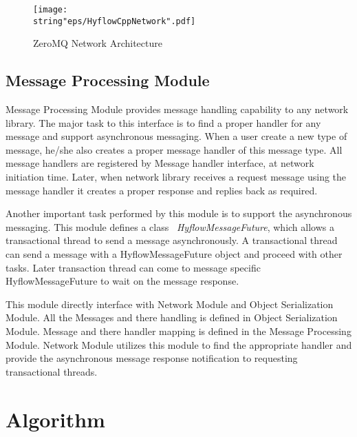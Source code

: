 \documentclass[12pt,english]{report}
\begin{document}
\begin{figure}
\begin{minipage}[b]{0.9\linewidth}\centering
\centering \texttt{[image: \\string"eps/HyflowCppNetwork".pdf]}
\caption{ZeroMQ Network Architecture}
\label{Fig:HyflowCppNetwork}
\end{minipage}
\end{figure}

\section{Message Processing Module}

Message Processing Module provides message handling capability to any network library. The major task to this interface is to find a proper handler for any message and support asynchronous messaging. When a user create a new type of message, he/she also creates a proper message handler of this message type. All message handlers are registered by Message handler interface, at network initiation time. Later, when network library receives a request message using the message handler it creates a proper response and replies back as required.

Another important task performed by this module is to support the asynchronous messaging. This module defines a class ~\emph{HyflowMessageFuture}, which allows a transactional thread to send a message asynchronously. A transactional thread can send a message with a HyflowMessageFuture object and proceed with other tasks. Later transaction thread can come to message specific HyflowMessageFuture to wait on the message response. 

This module directly interface with Network Module and Object Serialization Module. All the Messages and there handling is defined in Object Serialization Module. Message and there handler mapping is defined in the Message Processing Module. Network Module utilizes this module to find the appropriate handler and provide the asynchronous message response notification to requesting transactional threads.

\chapter{Algorithm}\label{chap:algorithm}
\end{document}
